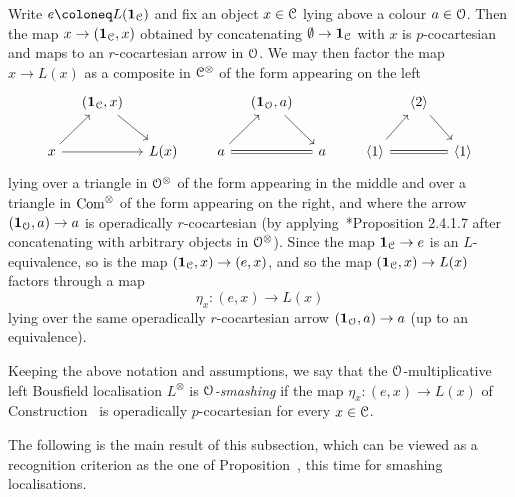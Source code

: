 \begin{construction}
\label{construction:eta}%
Write $e \coloneq L(\one_{\C})$ and fix an object $x \in \mathcal C$ lying above a colour $a \in \mathcal{O}$. 
Then the map $x \to (\mathbf{1}_\mathcal C,x)$ obtained by concatenating $\emptyset \to \mathbf{1}_{\mathcal C}$ with $x$ is $p$-cocartesian and maps to an $r$-cocartesian arrow in $\mathcal{O}$. We may then factor the map $x \to L(x)$ as a composite in $\mathcal C^\otimes$ of the form appearing on the left
\[
\begin{tikzcd}[column sep = 10pt]
& (\one_\C,x)\ar[dr] &     &&  & (\one_{\cO},a)\ar[dr] &   &&  & \<2\> \ar[dr] & \\
x \ar[ur]\ar[rr] && L(x) &&  a \ar[ur]\ar[rr,equal] && a && \<1\> \ar[ur]\ar[rr,equal] && \<1\>
\end{tikzcd}
\]
lying over a triangle in $\mathcal{O}^\otimes$ of the form appearing in the middle and over a triangle in $\mathrm{Com}^\otimes$ of the form appearing on the right, and where the arrow $(\mathbf{1}_{\mathcal{O}},a) \to a$ is operadically $r$-cocartesian (by applying~\cite{HTT}*{Proposition 2.4.1.7} after concatenating with arbitrary objects in $\mathcal{O}^{\otimes}$).
Since the map $\mathbf{1}_{\mathcal C} \to e$ is an $L$-equivalence, %
so is the map $(\mathbf{1}_{\mathcal C},x) \to (e,x)$, and so %
the map $(\mathbf{1}_{\mathcal C},x) \to L(x)$ factors through a map 
\[
\eta_x\colon (e,x) \to L(x)
\]
lying over the same operadically $r$-cocartesian arrow $(\mathbf{1}_{\mathcal{O}},a) \to a$ (up to an equivalence). 
\end{construction}


\begin{definition}
\label{definition:smashing}%
Keeping the above notation and assumptions, we say that the $\mathcal{O}$-multiplicative left Bousfield localisation $L^{\otimes}$ is \emph{$\mathcal{O}$-smashing} if the map $\eta_x\colon (e,x) \to L(x)$ of Construction~ is operadically $p$-cocartesian for every $x \in \mathcal C$.
\end{definition}

The following is the main result of this subsection, which can be viewed as a recognition criterion as the one of Proposition~, this time for smashing localisations.



